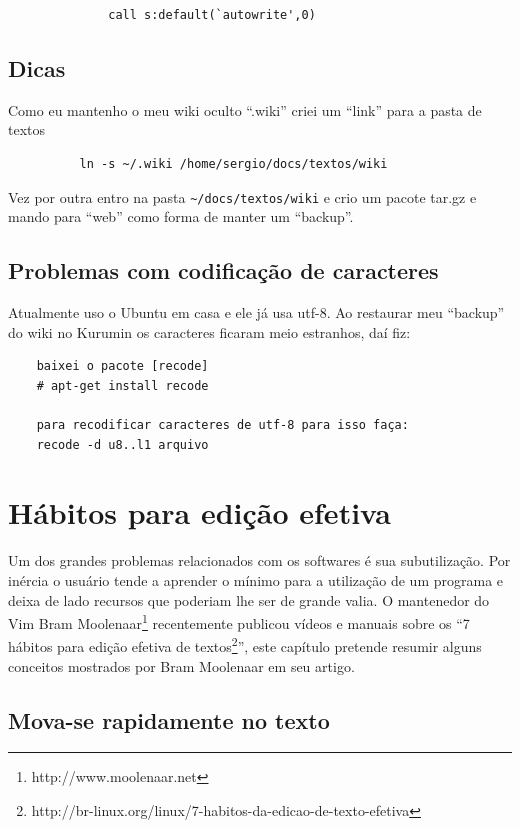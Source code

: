 \documentclass[10pt,a4paper,openany]{book}
\begin{document}
\begin{verbatim}
			  call s:default(`autowrite',0)
\end{verbatim}

\section{Dicas}
\label{Dicas}
Como eu mantenho o meu wiki oculto ``.wiki'' criei um ``link'' para a pasta de textos

\begin{verbatim}
		  ln -s ~/.wiki /home/sergio/docs/textos/wiki
\end{verbatim}

Vez por outra entro na pasta \verb|~/docs/textos/wiki| e crio um
pacote tar.gz e mando para ``web'' como forma de manter um ``backup''.

\section{Problemas com codificação de caracteres}
\label{Problemas com codificação de caracteres}

Atualmente uso o Ubuntu em casa e ele já usa utf-8. Ao restaurar meu
``backup'' do wiki no Kurumin os caracteres ficaram meio estranhos,
daí fiz:

\begin{verbatim}
	baixei o pacote [recode]
	# apt-get install recode

	para recodificar caracteres de utf-8 para isso faça:
	recode -d u8..l1 arquivo
\end{verbatim}

\chapter{Hábitos para edição efetiva}
\label{cha:Hábitos para edição efetiva}


Um dos grandes problemas relacionados com os softwares é sua subutilização. Por
inércia o usuário tende a aprender o mínimo para a utilização de um programa e
deixa de lado recursos que poderiam lhe ser de grande valia. O mantenedor do
Vim  Bram Moolenaar\footnote{http://www.moolenaar.net} recentemente publicou vídeos
e manuais sobre os ``7 hábitos para edição efetiva de
textos\footnote{http://br-linux.org/linux/7-habitos-da-edicao-de-texto-efetiva}'',
este capítulo pretende resumir alguns conceitos mostrados por Bram Moolenaar em
seu artigo.

\section{Mova-se rapidamente no texto}
\label{sec:Mova-se rapidamente no texto}
\end{document}
